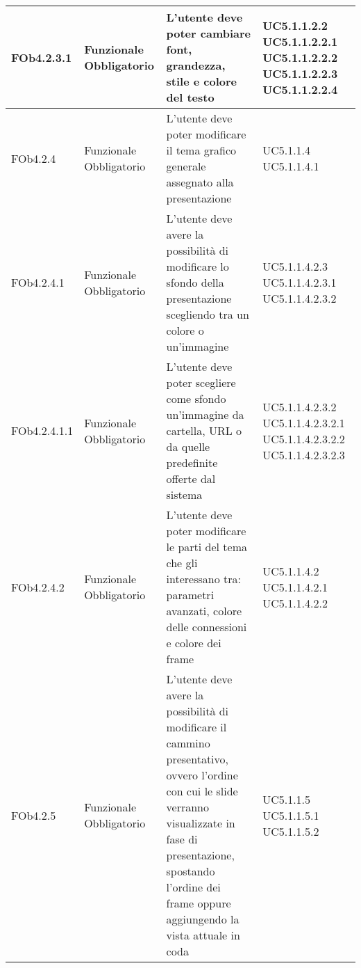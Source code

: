 \begin{longtable}{|l|p{2.5cm}|p{2cm}|l|}
\hline
FOb4.2.3.1 & Funzionale \linebreak Obbligatorio & L'utente deve poter cambiare font, grandezza, stile e colore del testo  & UC5.1.1.2.2 \linebreak  UC5.1.1.2.2.1 \linebreak  UC5.1.1.2.2.2 \linebreak  UC5.1.1.2.2.3 \linebreak  UC5.1.1.2.2.4 \linebreak  \\
\hline
FOb4.2.4 & Funzionale \linebreak Obbligatorio & L'utente deve poter modificare il tema grafico generale assegnato alla presentazione & UC5.1.1.4 \linebreak  UC5.1.1.4.1 \linebreak  \\
\hline
FOb4.2.4.1 & Funzionale \linebreak Obbligatorio & L'utente deve avere la possibilità di modificare lo sfondo della presentazione scegliendo tra un colore o un'immagine & UC5.1.1.4.2.3 \linebreak  UC5.1.1.4.2.3.1 \linebreak  UC5.1.1.4.2.3.2 \linebreak  \\
\hline
FOb4.2.4.1.1 & Funzionale \linebreak Obbligatorio & L'utente deve poter scegliere come sfondo un'immagine da cartella, URL  o da quelle predefinite offerte dal sistema & UC5.1.1.4.2.3.2 \linebreak  UC5.1.1.4.2.3.2.1 \linebreak  UC5.1.1.4.2.3.2.2 \linebreak  UC5.1.1.4.2.3.2.3 \linebreak  \\
\hline
FOb4.2.4.2 & Funzionale \linebreak Obbligatorio & L'utente deve poter modificare le parti del tema che gli interessano tra: parametri avanzati, colore delle connessioni e colore dei frame  & UC5.1.1.4.2 \linebreak  UC5.1.1.4.2.1 \linebreak  UC5.1.1.4.2.2 \linebreak  \\
\hline
FOb4.2.5 & Funzionale \linebreak Obbligatorio & L'utente deve avere la possibilità di modificare il cammino presentativo, ovvero l'ordine con cui le slide verranno visualizzate in fase di presentazione, spostando l'ordine dei frame  oppure aggiungendo la vista attuale in coda & UC5.1.1.5 \linebreak  UC5.1.1.5.1 \linebreak  UC5.1.1.5.2 \linebreak  \\

\end{longtable}
